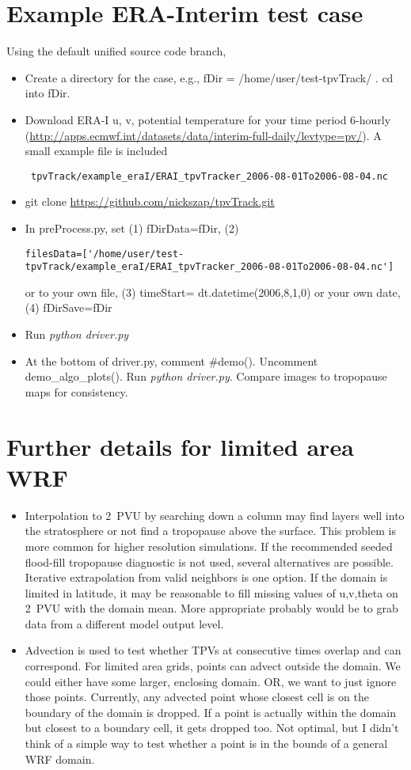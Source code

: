 \documentclass[a4paper]{article}
\begin{document}
\section{Example ERA-Interim test case}
Using the default unified source code branch,
\begin{itemize}
\item Create a directory for the case, e.g., fDir = /home/user/test-tpvTrack/ . cd into fDir.
\item Download ERA-I u, v, potential temperature for your time period 6-hourly (\url{http://apps.ecmwf.int/datasets/data/interim-full-daily/levtype=pv/}). A small example file is included \begin{verbatim} tpvTrack/example_eraI/ERAI_tpvTracker_2006-08-01To2006-08-04.nc \end{verbatim}
\item git clone \url{https://github.com/nickszap/tpvTrack.git}
\item In preProcess.py, set (1) fDirData=fDir, (2) \begin{verbatim}filesData=['/home/user/test-tpvTrack/example_eraI/ERAI_tpvTracker_2006-08-01To2006-08-04.nc']\end{verbatim} or to your own file, (3) timeStart= dt.datetime(2006,8,1,0) or your own date, (4) fDirSave=fDir
\item Run \emph{python driver.py}
\item At the bottom of driver.py, comment \#demo(). Uncomment demo\_algo\_plots(). Run \emph{python driver.py}. Compare images to tropopause maps for consistency.

\end{itemize}

\section{Further details for limited area WRF}
\begin{itemize}
\item Interpolation to 2~PVU by searching down a column may find layers well into the stratosphere or not find a tropopause above the surface. This problem is more common for higher resolution simulations. If the recommended seeded flood-fill tropopause diagnostic is not used, several alternatives are possible. Iterative extrapolation from valid neighbors is one option. If the domain is limited in latitude, it may be reasonable to fill missing values of u,v,theta on 2~PVU with the domain mean. More appropriate probably would be to grab data from a different model output level.
\item Advection is used to test whether TPVs at consecutive times overlap and can correspond. For limited area grids, points can advect outside the domain. We could either have some larger, enclosing domain. OR, we want to just ignore those points. Currently, any advected point whose closest cell is on the boundary of the domain is dropped. If a point is actually within the domain but closest to a boundary cell, it gets dropped too. Not optimal, but I didn't think of a simple way to test whether a point is in the bounds of a general WRF domain.
\end{itemize}
\end{document}
